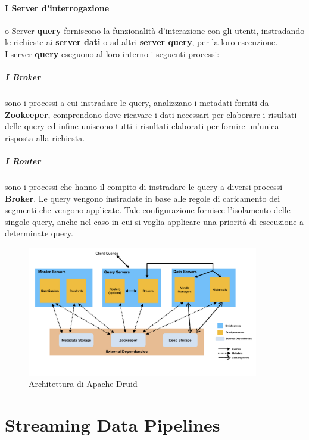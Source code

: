 \paragraph{I Server d'interrogazione} o Server \textbf{query} forniscono la funzionalità d'interazione con gli utenti, instradando le richieste  
ai \textbf{server dati} o ad altri \textbf{server query}, per la loro esecuzione. \\
I server \textbf{query} eseguono al loro interno i seguenti processi:
\subparagraph{I Broker} sono i processi a cui instradare le query, analizzano i \gls{metadati}{} forniti
da \textbf{Zookeeper}, comprendono dove ricavare i dati necessari per elaborare i risultati delle query ed 
infine uniscono tutti i risultati elaborati per fornire un’unica risposta alla richiesta.\\
\subparagraph{I Router} sono i processi che hanno il compito di instradare le query a diversi processi \textbf{Broker}. Le query
vengono instradate in base alle regole di caricamento dei segmenti che vengono applicate.
Tale configurazione fornisce l’isolamento delle singole query, anche nel caso in cui si voglia applicare 
una priorità di esecuzione a determinate query.\\
\begin{figure}[h]   
    \centering
    \includegraphics[width=0.9\textwidth]{images/componenti/druid_architectcture.png}
    \caption{Architettura di Apache Druid}
    \label{fig:druid_architecture}
\end{figure}
\pagebreak
\section{Streaming Data Pipelines}
\newpage
\pagestyle{empty}
\null %
\newpage